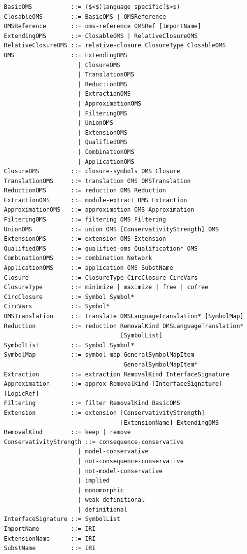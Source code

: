 \documentclass[10pt,fleqn,final]{scrreprt}
\newenvironment{definitions}[0]{\medskip }{}
\begin{document}
\begin{definitions}
\begin{lstlisting}[language=ebnf,escapeinside={()}]
BasicOMS           ::= ($<$)language specific($>$) 
ClosableOMS        ::= BasicOMS | OMSReference
OMSReference       ::= oms-reference OMSRef [ImportName]
ExtendingOMS       ::= ClosableOMS | RelativeClosureOMS
RelativeClosureOMS ::= relative-closure ClosureType ClosableOMS
OMS                ::= ExtendingOMS
                     | ClosureOMS
                     | TranslationOMS
                     | ReductionOMS
                     | ExtractionOMS
                     | ApproximationOMS
                     | FilteringOMS
                     | UnionOMS
                     | ExtensionOMS
                     | QualifiedOMS
                     | CombinationOMS
                     | ApplicationOMS
ClosureOMS         ::= closure-symbols OMS Closure
TranslationOMS     ::= translation OMS OMSTranslation
ReductionOMS       ::= reduction OMS Reduction
ExtractionOMS      ::= module-extract OMS Extraction
ApproximationOMS   ::= approximation OMS Approximation
FilteringOMS       ::= filtering OMS Filtering
UnionOMS           ::= union OMS [ConservativityStrength] OMS
ExtensionOMS       ::= extension OMS Extension
QualifiedOMS       ::= qualified-oms Qualification* OMS
CombinationOMS     ::= combination Network
ApplicationOMS     ::= application OMS SubstName
Closure            ::= ClosureType CircClosure CircVars
ClosureType        ::= minimize | maximize | free | cofree
CircClosure        ::= Symbol Symbol*
CircVars           ::= Symbol*
OMSTranslation     ::= translate OMSLanguageTranslation* [SymbolMap]
Reduction          ::= reduction RemovalKind OMSLanguageTranslation*
                                 [SymbolList]
SymbolList         ::= Symbol Symbol*
SymbolMap          ::= symbol-map GeneralSymbolMapItem
                                  GeneralSymbolMapItem*
Extraction         ::= extraction RemovalKind InterfaceSignature
Approximation      ::= approx RemovalKind [InterfaceSignature] [LogicRef]
Filtering          ::= filter RemovalKind BasicOMS
Extension          ::= extension [ConservativityStrength]
                                 [ExtensionName] ExtendingOMS
RemovalKind        ::= keep | remove
ConservativityStrength ::= consequence-conservative
                     | model-conservative
                     | not-consequence-conservative
                     | not-model-conservative
                     | implied
                     | monomorphic
                     | weak-definitional
                     | definitional
InterfaceSignature ::= SymbolList
ImportName         ::= IRI
ExtensionName      ::= IRI
SubstName          ::= IRI
\end{lstlisting}


\end{definitions}
\end{document}

